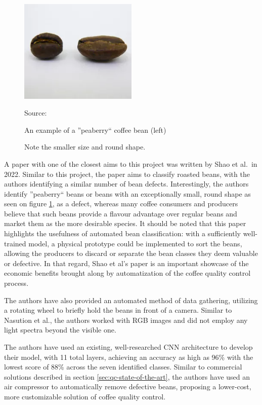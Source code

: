 \begin{figure}
	\includegraphics[width=0.5\textwidth]{figures/litReview/peaberry-vs-normal}
	\caption*
	{Source: \cite{peaberryImg}}
	\caption{An example of a ''peaberry`` coffee bean (left)}
	\caption*
	{Note the smaller size and round shape.} \label{fig:peaberryComparison}
\end{figure}
A paper with one of the closest aims to this project was written by Shao et al.\ in
2022\cite{rgbDeepLearningShao}. Similar to this project, the paper aims to
classify roasted beans, with the authors identifying a similar number of bean defects.
Interestingly, the authors identify ''peaberry`` beans or beans with an exceptionally
small, round shape as seen on figure \ref{fig:peaberryComparison}, as a defect,
whereas many coffee consumers and producers believe that such beans provide a
flavour advantage over regular beans and market them as the more desirable
species. It should be noted that this paper highlights the usefulness of automated
bean classification: with a sufficiently well-trained model, a physical prototype
could be implemented to sort the beans, allowing the producers to discard or
separate the bean classes they deem valuable or defective. In that regard, Shao
et al's paper is an important showcase of the economic benefits brought along by
automatization of the coffee quality control process.

The authors have also provided an automated method of data gathering, utilizing a
rotating wheel to briefly hold the beans in front of a camera. Similar to
Nasution et al.\cite{manyRoastLevelsNasution}, the authors worked with RGB images
and did not employ any light spectra beyond the visible one.

The authors have used an existing, well-researched CNN architecture to develop
their model, with 11 total layers, achieving an accuracy as high as 96\% with the
lowest score of 88\% across the seven identified classes. Similar to commercial solutions
described in section \ref{sec:qc-state-of-the-art}, the authors have used an air
compressor to automatically remove defective beans, proposing a lower-cost, more
customizable solution of coffee quality control.

